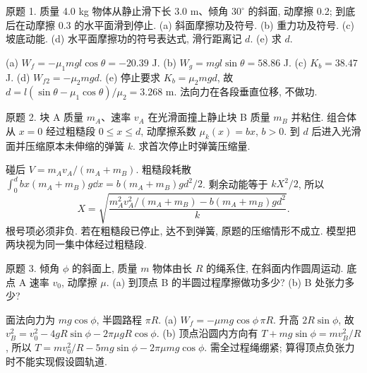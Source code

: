 \begin{exercise}
原题 1. 质量 4.0 kg 物体从静止滑下长 3.0 m、倾角 $30^\circ$ 的斜面, 动摩擦 0.2; 到底后在动摩擦 0.3 的水平面滑到停止. (a) 斜面摩擦功及符号. (b) 重力功及符号. (c) 坡底动能. (d) 水平面摩擦功的符号表达式, 滑行距离记 $d$. (e) 求 $d$.
\end{exercise}
\begin{solution}
(a) $W_f=-\mu_1mgl\cos\theta=-20.39$ J. (b) $W_g=mgl\sin\theta=58.86$ J. (c) $K_b=38.47$ J. (d) $W_{f2}=-\mu_2mgd$. (e) 停止要求 $K_b=\mu_2mgd$, 故 $d=l(\sin\theta-\mu_1\cos\theta)/\mu_2=3.268$ m. 法向力在各段垂直位移, 不做功.
\end{solution}
\begin{exercise}
原题 2. 块 A 质量 $m_A$、速率 $v_A$ 在光滑面撞上静止块 B 质量 $m_B$ 并粘住. 组合体从 $x=0$ 经过粗糙段 $0\le x\le d$, 动摩擦系数 $\mu_k(x)=bx$, $b>0$. 到 $d$ 后进入光滑面并压缩原本未伸缩的弹簧 $k$. 求首次停止时弹簧压缩量.
\end{exercise}
\begin{solution}
碰后 $V=m_Av_A/(m_A+m_B)$. 粗糙段耗散 $\int_0^dbx(m_A+m_B)g\dd x=b(m_A+m_B)gd^2/2$. 剩余动能等于 $kX^2/2$, 所以
\begin{equation}
X=\sqrt{\frac{m_A^2v_A^2/(m_A+m_B)-b(m_A+m_B)gd^2}{k}}.
\end{equation}
根号项必须非负. 若在粗糙段已停止, 达不到弹簧, 原题的压缩情形不成立. 模型把两块视为同一集中体经过粗糙段.
\end{solution}
\begin{exercise}
原题 3. 倾角 $\phi$ 的斜面上, 质量 $m$ 物体由长 $R$ 的绳系住, 在斜面内作圆周运动. 底点 A 速率 $v_0$, 动摩擦 $\mu$. (a) 到顶点 B 的半圆过程摩擦做功多少? (b) B 处张力多少?
\end{exercise}
\begin{solution}
面法向力为 $mg\cos\phi$, 半圆路程 $\pi R$. (a) $W_f=-\mu mg\cos\phi\,\pi R$. 升高 $2R\sin\phi$, 故 $v_B^2=v_0^2-4gR\sin\phi-2\pi\mu gR\cos\phi$. (b) 顶点沿圆内方向有 $T+mg\sin\phi=mv_B^2/R$, 所以 $T=mv_0^2/R-5mg\sin\phi-2\pi\mu mg\cos\phi$. 需全过程绳绷紧; 算得顶点负张力时不能实现假设圆轨道.
\end{solution}
